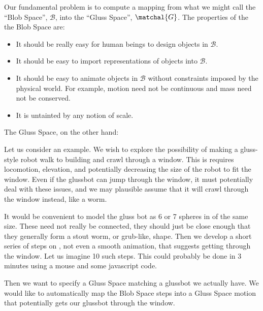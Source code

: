 \documentclass[11pt]{article}
\begin{document}
Our fundamental problem is to compute a mapping from what we might call the ``Blob Space'', $\mathcal{B}$, into
the ``Gluss Space'', $\matchal{G}$. The properties of the the Blob Space are:
\begin{itemize}  
\item It should be really easy for human beings to design objects in $\mathcal{B}$.
\item It should be easy to import representations of objects into $\mathcal{B}$.
\item It should be easy to animate objects in $\mathcal{B}$ without constraints imposed by
  the physical world.  For example, motion need not be continuous and mass need not be conserved.
\item It is untainted by any notion of scale.
\end{itemize}  

The Gluss Space, on the other hand:

Let us consider an example.  We wish to explore the possibility of making a gluss-style robot
walk to  building and crawl through a window. This is requires locomotion, elevation, and
potentially decreasing the size of the robot to fit the window.  Even if the glussbot can
jump through the window, it must potentially deal with these issues, and we may plausible
assume that it will crawl through the window instead, like a worm.

It would be convenient to model the gluss bot as 6 or 7 spheres in  of the same size.
These need not really be connected, they should just be close enough that they generally form
a stout worm, or grub-like, shape.  Then we develop a short series of steps on , not
even a smooth animation, that suggests getting through the window. Let us imagine 10 such steps.
This could probably be done in 3 minutes using a mouse and some javascript code.

Then we want to specify a Gluss Space matching a glussbot we actually have. We would like
to automatically map the Blob Space steps into a Gluss Space motion that potentially gets our
glussbot through the window.
\end{document}
